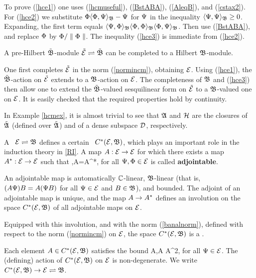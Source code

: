 To prove (\ref{hce1}) one uses (\ref{hcmuseful}), (\ref{BstABA}),
 (\ref{AleqB}), and (\ref{cstax2}).  For (\ref{hce2}) we substitute
 $\Phi\langle\Phi,\Psi\rangle_{\frak B}-\Psi$ for $\Psi$ in the inequality $\langle\Psi,\Psi\rangle_{\frak B}\geq
 0$. Expanding, the first term equals
 $\langle\Psi,\Phi\rangle_{\frak B}\langle\Phi,\Phi\rangle_{\frak B}\langle\Phi,\Psi\rangle_{\frak B}$. Then use (\ref{BstABA}),
 and replace $\Phi$ by $\Phi/\parallel\Phi\parallel$.  The inequality (\ref{hce3}) is
 immediate from (\ref{hce2}).  \enp
\begin{Corollary}
A pre-Hilbert $\tilde{{\frak B}}$-module $\tilde{{\cal E}}\rightleftharpoons\tilde{{\frak B}}$ can be
completed to a Hilbert ${\frak B}$-module. \end{Corollary}

 One first completes $\tilde{{\cal E}}$ in the norm (\ref{normincm}),
obtaining ${\cal E}$. Using (\ref{hce1}), the $\tilde{{\frak B}}$-action on
$\tilde{{\cal E}}$ extends to a ${\frak B}$-action on ${\cal E}$. The completeness of
${\frak B}$ and (\ref{hce3}) then allow one to extend the $\tilde{{\frak B}}$-valued
sesquilinear form on $\tilde{{\cal E}}$ to a ${\frak B}$-valued one on ${\cal E}$. It is
easily checked that the required properties hold by continuity.\enp

In Example \ref{hcmex}, it is almost trivial to see that ${\frak A}$ and ${\cal H}$
  are the closures of $\tilde{{\frak A}}$ (defined over
 $\tilde{{\frak A}}$) and  of a dense subspace ${\cal D}$,  respectively.

A \HCM\ ${\cal E}\rightleftharpoons{\frak B}$ defines a certain \ca\ $C^*({\cal E},{\frak B})$, which plays
an important role in the induction theory in \ref{RI}.  A map
$A:{\cal E}\rightarrow{\cal E}$ for which there exists a map $A^*:{\cal E}\rightarrow{\cal E}$ such that
\be \la \Ps,A\Ph\bb=\la A^*\Ps,\Ph\bb {} \ee for all
$\Psi,\Phi\in{\cal E}$ is called {\bf adjointable}.
\begin{Theorem}
 An adjointable map is automatically ${\Bbb C}$-linear, ${\frak B}$-linear (that
is, $(A\Psi)B=A(\Psi B)$ for all $\Psi\in{\cal E}$ and $B\in{\frak B}$), and bounded.
The adjoint of an adjointable map is unique, and the map $A\rightarrow A^*$
defines an involution on the space $C^*({\cal E},{\frak B})$ of all adjointable
maps on ${\cal E}$.

Equipped with this involution, and with the norm (\ref{banalnorm}),
defined with respect to the norm (\ref{normincm}) on ${\cal E}$, the space
$C^*({\cal E},{\frak B})$ is a \ca.

Each element $A\in C^*({\cal E},{\frak B})$ satisfies the bound \be \la
A\Ps,A\Ps\bb \,\leq\,\n A\n^2\la\Ps,\Ps\bb {} \ee for
all $\Psi\in{\cal E}$.  The (defining) action of $C^*({\cal E},{\frak B})$ on ${\cal E}$ is
non-degenerate. We write $C^*({\cal E},{\frak B})\rightarrow{\cal E}\rightleftharpoons{\frak B}$.
\end{Theorem}

